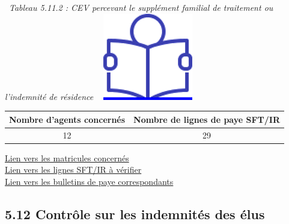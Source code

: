 ~\emph{Tableau 5.11.2 : CEV percevant le supplément familial de
traitement ou l'indemnité de résidence} ~
\href{../Docs/Notices/fiche_CEV_SFT.odt}{\includegraphics{icones/Notice.png}}

\begin{longtable}[]{@{}cc@{}}
\toprule
Nombre d'agents concernés & Nombre de lignes de paye
SFT/IR\tabularnewline
\midrule
\endhead
12 & 29\tabularnewline
\bottomrule
\end{longtable}

\href{../Bases/Reglementation/matricules.SFT_IR.et.vacations.csv}{Lien vers
les matricules concernés}\\
\href{../Bases/Reglementation/SFT_IR.et.vacations.csv}{Lien vers les lignes
SFT/IR à vérifier}\\
\href{../Bases/Reglementation/Paie_vac_sft_ir.csv}{Lien vers les bulletins
de paye correspondants}

\hypertarget{controle-sur-les-indemnites-des-elus}{%
\subsection{5.12 Contrôle sur les indemnités des
élus}\label{controle-sur-les-indemnites-des-elus}}

